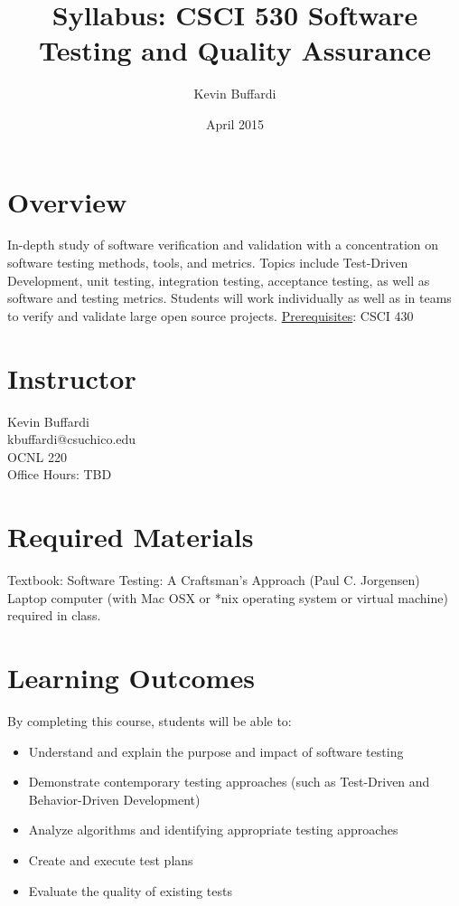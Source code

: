 \documentclass[12pt]{article}
\title{Syllabus: CSCI 530 Software Testing and Quality Assurance}
\author{Kevin Buffardi}
\date{April 2015}
\begin{document}
  \maketitle
  \section*{Overview}	 
  \noindent
  In-depth study of software verification and validation with a concentration on software testing methods, tools, and metrics. Topics include Test-Driven Development, unit testing, integration testing, acceptance testing, as well as software and testing metrics. Students will work individually as well as in teams to verify and validate large open source projects.
  \newline
  \newline
  \underline{Prerequisites}: CSCI 430 \\
  
  \section*{Instructor}
  \noindent
  Kevin Buffardi \\
  kbuffardi@csuchico.edu \\
  OCNL 220 \\
  Office Hours: TBD\\

  \section*{Required Materials}
  \noindent
  Textbook: Software Testing: A Craftsman's Approach (Paul C. Jorgensen)
  \newline
  Laptop computer (with Mac OSX or *nix operating system or virtual machine) required in class.

  \section*{Learning Outcomes}
  \noindent
  By completing this course, students will be able to:
  \begin{itemize}
    \item Understand and explain the purpose and impact of software testing
    \item Demonstrate contemporary testing approaches (such as Test-Driven and Behavior-Driven Development)
    \item Analyze algorithms and identifying appropriate testing approaches
    \item Create and execute test plans
    \item Evaluate the quality of existing tests
  \end{itemize}
\end{document}
